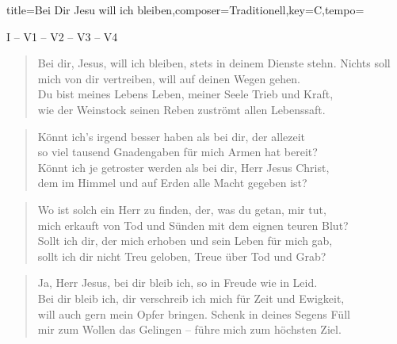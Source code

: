 \documentclass{leadsheet}
\begin{document}
\begin{song}{title={Bei Dir Jesu will ich bleiben},composer={Traditionell},key={C},tempo={}}

\begin{schedule}
I -- V1 -- V2 -- V3 -- V4
\end{schedule}
\begin{verse}
Bei dir, Jesus, will ich bleiben, stets in deinem Dienste stehn.
Nichts soll mich von dir vertreiben, will auf deinen Wegen gehen. \\
Du bist meines Lebens Leben, meiner Seele Trieb und Kraft, \\
wie der Weinstock seinen Reben zuströmt allen Lebenssaft.
\end{verse}
\begin{verse}
Könnt ich's irgend besser haben als bei dir, der allezeit \\
so viel tausend Gnadengaben für mich Armen hat bereit? \\
Könnt ich je getroster werden als bei dir, Herr Jesus Christ, \\
dem im Himmel und auf Erden alle Macht gegeben ist?
\end{verse}
\begin{verse}
Wo ist solch ein Herr zu finden, der, was du getan, mir tut, \\
mich erkauft von Tod und Sünden mit dem eignen teuren Blut? \\
Sollt ich dir, der mich erhoben und sein Leben für mich gab, \\
sollt ich dir nicht Treu geloben, Treue über Tod und Grab?
\end{verse}
\begin{verse}
Ja, Herr Jesus, bei dir bleib ich, so in Freude wie in Leid. \\
Bei dir bleib ich, dir verschreib ich mich für Zeit und Ewigkeit, \\
will auch gern mein Opfer bringen. Schenk in deines Segens Füll \\
mir zum Wollen das Gelingen -- führe mich zum höchsten Ziel. 
\end{verse}

\end{song}
\end{document}
